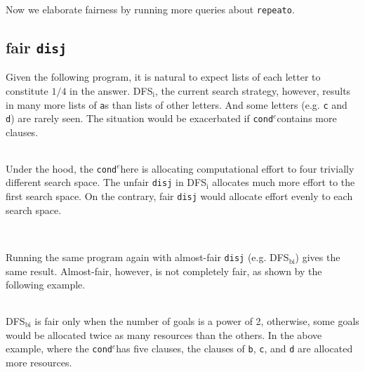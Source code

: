 \documentclass[format=acmlarge, review=true, authordraft=true]{acmart}
\newcommand{\conde}{\texttt{cond$^e$}}
\newcommand{\disj}{\texttt{disj}}
\newcommand{\DFSi}[0]{DFS$_\textrm{i}$}
\begin{document}
Now we elaborate fairness by running more queries about \texttt{repeato}.

\subsection{fair \texttt{disj}}

Given the following program, it is natural to expect lists of each letter to
constitute $1/4$ in the answer. DFS$_\textrm{i}$, the current search
strategy, however, results in many more lists of \texttt{a}s than lists
of other letters. And some letters  (e.g. \texttt{c} and \texttt{d}) are
rarely seen. The situation would be exacerbated if \conde contains more clauses.

\begin{center}
	\begin{tabular}{c}
		
	\end{tabular}
\end{center}

Under the hood, the \conde here is allocating computational effort to 
four trivially different search space. The unfair \disj{} in 
\DFSi{} allocates much more effort to the first search space. On the contrary, 
fair \disj{} would allocate effort evenly to each search space.

\begin{center}
	\begin{tabular}{c}
		
	\end{tabular}
\end{center}
\begin{center}
\begin{tabular}{c}
	
\end{tabular}
\end{center}

Running the same program again with almost-fair \disj 
(e.g. DFS$_\textrm{bi}$) gives the same result. Almost-fair, however, is not 
completely fair, as shown by the following example. 

\begin{center}
	\begin{tabular}{c}
		
	\end{tabular}
\end{center}

DFS$_\textrm{bi}$ is fair only when the number of goals is a power of 2, 
otherwise, some goals would be allocated twice as many resources than the 
others. In the above example, where the \conde has five clauses, the clauses of 
\texttt{b}, \texttt{c}, and \texttt{d} are allocated more resources.
\end{document}
